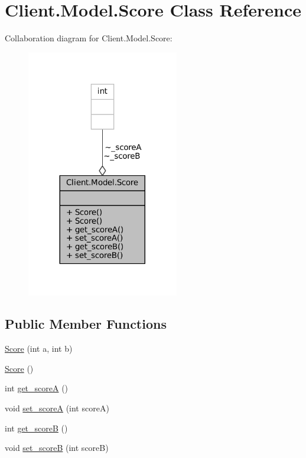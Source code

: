 \hypertarget{classClient_1_1Model_1_1Score}{}\section{Client.\+Model.\+Score Class Reference}
\label{classClient_1_1Model_1_1Score}


Collaboration diagram for Client.\+Model.\+Score\+:
\nopagebreak
\begin{figure}[H]
\begin{center}
\leavevmode
\includegraphics[width=188pt]{classClient_1_1Model_1_1Score__coll__graph}
\end{center}
\end{figure}
\subsection*{Public Member Functions}
\begin{DoxyCompactItemize}
\item 
\mbox{\hyperlink{classClient_1_1Model_1_1Score_a74a6c9f28cfb3bcc6e7f6e29bf627009}{Score}} (int a, int b)
\item 
\mbox{\hyperlink{classClient_1_1Model_1_1Score_ab469f2ace75be01b2eda077e15e753b7}{Score}} ()
\item 
int \mbox{\hyperlink{classClient_1_1Model_1_1Score_a8fb4e69a2eb1ec879cab4cf4bb017f9b}{get\+\_\+scoreA}} ()
\item 
void \mbox{\hyperlink{classClient_1_1Model_1_1Score_a53eea45adc659276ed4a521c8244e763}{set\+\_\+scoreA}} (int scoreA)
\item 
int \mbox{\hyperlink{classClient_1_1Model_1_1Score_a26810cd9664942d722198c892866f4b7}{get\+\_\+scoreB}} ()
\item 
void \mbox{\hyperlink{classClient_1_1Model_1_1Score_a2090cd988d6f53fc05637ed59aa7b3b1}{set\+\_\+scoreB}} (int scoreB)
\end{DoxyCompactItemize}


